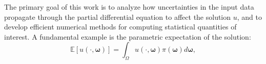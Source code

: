 The primary goal of this work is to analyze how uncertainties in the input data propagate through the partial differential equation to affect the solution $u$, and to develop efficient numerical methods for computing statistical quantities of interest. A fundamental example is the parametric expectation of the solution:
%
 \begin{equation}
 \label{eq:QoI}
      \mathbb{E}\left[u(\cdot,\boldsymbol \omega)\right]=\int_\Omega u(\cdot,\boldsymbol{\omega})\pi(\boldsymbol\omega)d\boldsymbol{\omega},
 \end{equation}
%

